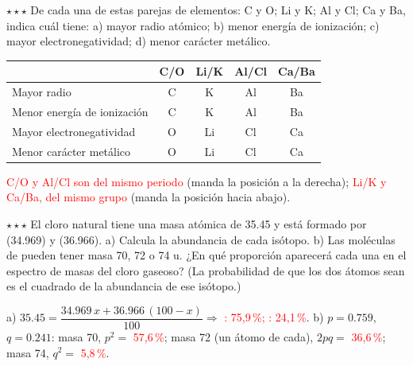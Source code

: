 \begin{exercise}
    \(\star\star\star\) De cada una de estas parejas de elementos: C y O; Li y K; Al y Cl; Ca y Ba, indica cuál tiene: a) mayor radio
    atómico; b) menor energía de ionización; c) mayor electronegatividad; d) menor carácter metálico.
    \begin{solu}
        \begin{tabular}{@{}lcccc@{}}
            \toprule
            & \textbf{C/O} & \textbf{Li/K} & \textbf{Al/Cl} & \textbf{Ca/Ba} \\
            \midrule
            Mayor radio & C & K & Al & Ba \\[3pt]
            Menor energía de ionización & C & K & Al & Ba \\[3pt]
            Mayor electronegatividad & O & Li & Cl & Ca \\[3pt]
            Menor carácter metálico & O & Li & Cl & Ca \\
            \bottomrule
        \end{tabular}

        \textcolor{red}{C/O y Al/Cl son del mismo periodo} (manda la posición a la derecha); \textcolor{red}{Li/K y Ca/Ba, del mismo
        grupo} (manda la posición hacia abajo).
    \end{solu}
\end{exercise}

\begin{exercise}
    \(\star\star\star\) El cloro natural tiene una masa atómica de \qty{35.45}{\uma} y está formado por 
    (\qty{34.969}{\uma}) y  (\qty{36.966}{\uma}). a) Calcula la abundancia de cada isótopo. b) Las moléculas de 
    pueden tener masa 70, 72 o 74 u. ¿En qué proporción aparecerá cada una en el espectro de masas del cloro gaseoso? (La
    probabilidad de que los dos átomos sean  es el cuadrado de la abundancia de ese isótopo.)
    \begin{solu}
        a) \(\num{35.45} = \dfrac{\num{34.969}\,x + \num{36.966}\,(100 - x)}{100} \Rightarrow\) \textcolor{red}{: 75,9\,\%;
        : 24,1\,\%}. b) \(p = \num{0.759}\), \(q = \num{0.241}\): masa 70, \(p^2 =\) \textcolor{red}{57,6\,\%}; masa 72
        (un átomo de cada), \(2pq =\) \textcolor{red}{36,6\,\%}; masa 74, \(q^2 =\) \textcolor{red}{5,8\,\%}.
    \end{solu}
\end{exercise}
